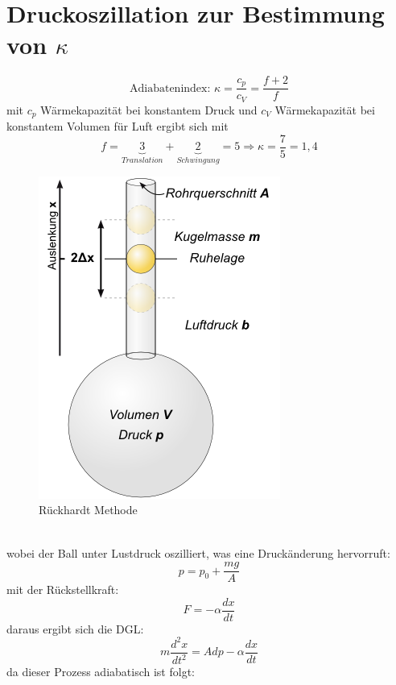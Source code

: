 \documentclass[10pt,a4paper]{article}
\author{Erik Zimmermann}
\begin{document}
\section{Druckoszillation zur Bestimmung von $\kappa$}
\begin{equation}
\text{Adiabatenindex: } \kappa= \frac{c_p}{c_V}=\frac{f+2}{f}
\end{equation}
mit $c_p$ Wärmekapazität bei konstantem Druck\newline
und $c_V$ Wärmekapazität bei konstantem Volumen\newline
für Luft ergibt sich mit
\begin{equation}
f=\underbrace{3}_{Translation}+\underbrace{2}_{Schwingung}=5 \Rightarrow \kappa=\frac{7}{5}=1,4
\end{equation} 
\begin{figure}[hbtp]
\caption{Rückhardt Methode}
\centering
\includegraphics[scale=0.5]{4338.png}\end{figure}\\
wobei der Ball unter Lustdruck oszilliert, was eine Druckänderung hervorruft:
\begin{equation}
p=p_0+ \frac{m g}{A}
\end{equation}
mit der Rückstellkraft:
\begin{equation}
F=-\alpha \frac{dx}{dt}
\end{equation}
daraus ergibt sich die DGL:
\begin{equation}
m\frac{d^2x}{dt^2}=A dp - \alpha \frac{dx}{dt}
\end{equation}
da dieser Prozess adiabatisch ist folgt:
\end{document}
